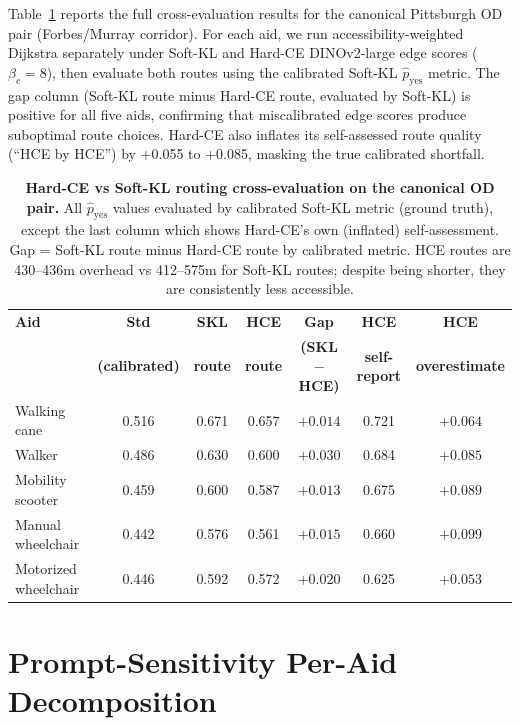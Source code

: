 \documentclass[conference]{IEEEtran}
\begin{document}
Table~\ref{tab:supp_crosseval} reports the full cross-evaluation results for the canonical Pittsburgh OD pair (Forbes/Murray corridor). For each aid, we run accessibility-weighted Dijkstra separately under Soft-KL and Hard-CE DINOv2-large edge scores ($\beta_c = 8$), then evaluate both routes using the calibrated Soft-KL $\hat{p}_\mathrm{yes}$ metric. The gap column (Soft-KL route minus Hard-CE route, evaluated by Soft-KL) is positive for all five aids, confirming that miscalibrated edge scores produce suboptimal route choices. Hard-CE also inflates its self-assessed route quality (``HCE by HCE'') by +0.055 to +0.085, masking the true calibrated shortfall.

\begin{table}[!t]
\caption{\textbf{Hard-CE vs Soft-KL routing cross-evaluation on the canonical OD pair.} All $\hat{p}_\mathrm{yes}$ values evaluated by calibrated Soft-KL metric (ground truth), except the last column which shows Hard-CE's own (inflated) self-assessment. Gap = Soft-KL route minus Hard-CE route by calibrated metric. HCE routes are 430--436m overhead vs 412--575m for Soft-KL routes; despite being shorter, they are consistently less accessible.}
\label{tab:supp_crosseval}
\centering\small
\setlength{\tabcolsep}{4pt}
\begin{tabular}{@{}lcccccc@{}}
\toprule
\textbf{Aid} & \textbf{Std} & \textbf{SKL} & \textbf{HCE} & \textbf{Gap} & \textbf{HCE} & \textbf{HCE} \\
             & \textbf{(calibrated)} & \textbf{route} & \textbf{route} & \textbf{(SKL$-$HCE)} & \textbf{self-report} & \textbf{overestimate} \\
\midrule
Walking cane         & 0.516 & 0.671 & 0.657 & $+0.014$ & 0.721 & $+0.064$ \\
Walker               & 0.486 & 0.630 & 0.600 & $+0.030$ & 0.684 & $+0.085$ \\
Mobility scooter     & 0.459 & 0.600 & 0.587 & $+0.013$ & 0.675 & $+0.089$ \\
Manual wheelchair    & 0.442 & 0.576 & 0.561 & $+0.015$ & 0.660 & $+0.099$ \\
Motorized wheelchair & 0.446 & 0.592 & 0.572 & $+0.020$ & 0.625 & $+0.053$ \\
\bottomrule
\end{tabular}
\end{table}

\FloatBarrier
\section{Prompt-Sensitivity Per-Aid Decomposition}
\label{sec:supp_prompts}
\end{document}
